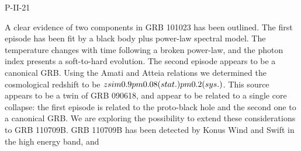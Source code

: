 P-II-21


\bigskip



\bigskip

\noindent A clear evidence of two components in GRB 101023 has been outlined. The first episode has been fit by a black body plus power-law spectral model. The temperature changes with time following a broken power-law, and the photon index presents a soft-to-hard evolution. The second episode appears to be a canonical GRB. Using the Amati and Atteia relations we determined the cosmological redshift to be $z \\sim 0.9 \\pm 0.08 (stat.) \\pm 0.2 (sys.)$. This source appears to be a twin of GRB 090618, and appear to be related to a single core collapse: the first episode is related to the proto-black hole and the second one to a canonical GRB. We are exploring the possibility to extend these considerations to GRB 110709B. GRB 110709B has been detected by Konus Wind and Swift in the high energy band, and

